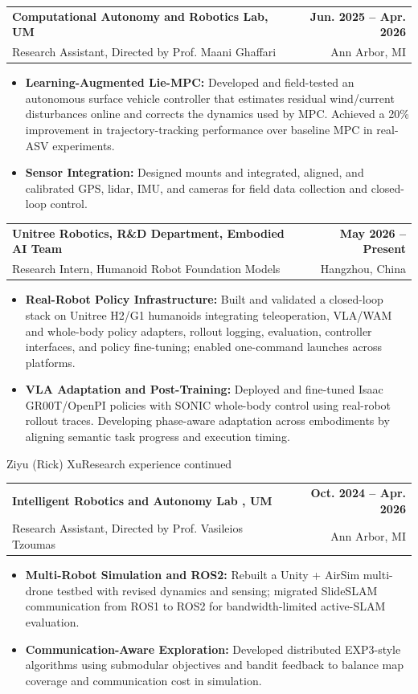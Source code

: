 \documentclass[11pt,letterpaper]{article}
\makeatletter
\newcommand{\resumeSubheading}[4]{
    \begin{tabularx}{\textwidth}{@{}Xr@{}}
        \textbf{#1} & \textbf{#2} \\
        #3 & #4 \\
    \end{tabularx}
}
\newcommand{\resumeItem}[1]{
    \item #1
}
\makeatother
\begin{document}
\resumeSubheading
{Computational Autonomy and Robotics Lab, UM }
{Jun. 2025 -- Apr. 2026}
{\hspace*{1.4em}Research Assistant, Directed by Prof. Maani Ghaffari}
{Ann Arbor, MI}
\begin{itemize}[leftmargin=2.4em, itemsep=0.5pt, topsep=0pt]
\small
\resumeItem{\textbf{Learning-Augmented Lie-MPC:} Developed and field-tested an autonomous surface vehicle controller that estimates residual wind/current disturbances online and corrects the dynamics used by MPC. Achieved a 20\% improvement in trajectory-tracking performance over baseline MPC in real-ASV experiments.}
\resumeItem{\textbf{Sensor Integration:} Designed mounts and integrated, aligned, and calibrated GPS, lidar, IMU, and cameras for field data collection and closed-loop control.}
\end{itemize}

\resumeSubheading
{ Unitree Robotics, R\&D Department, Embodied AI Team}
{May 2026 -- Present}
{\hspace*{1.4em}Research Intern, Humanoid Robot Foundation Models}
{Hangzhou, China}
\begin{itemize}[leftmargin=2.4em, itemsep=0.5pt, topsep=0pt]
\small
\resumeItem{\textbf{Real-Robot Policy Infrastructure:} Built and validated a closed-loop stack on Unitree H2/G1 humanoids integrating teleoperation, VLA/WAM and whole-body policy adapters, rollout logging, evaluation, controller interfaces, and policy fine-tuning; enabled one-command launches across platforms.}
\resumeItem{\textbf{VLA Adaptation and Post-Training:} Deployed and fine-tuned Isaac GR00T/OpenPI policies with SONIC whole-body control using real-robot rollout traces. Developing phase-aware adaptation across embodiments by aligning semantic task progress and execution timing.}
\end{itemize}

\newpage
{\small Ziyu (Rick) Xu}\hfill{\small Research experience continued}
\vspace{4pt}
\resumeSubheading
{Intelligent Robotics and Autonomy Lab , UM}
{Oct. 2024 -- Apr. 2026}
{\hspace*{1.4em}Research Assistant, Directed by Prof. Vasileios Tzoumas}
{Ann Arbor, MI}
\begin{itemize}[leftmargin=2.4em, itemsep=0.5pt, topsep=0pt]
\small
\resumeItem{\textbf{Multi-Robot Simulation and ROS2:} Rebuilt a Unity + AirSim multi-drone testbed with revised dynamics and sensing; migrated SlideSLAM communication from ROS1 to ROS2 for bandwidth-limited active-SLAM evaluation.}
\resumeItem{\textbf{Communication-Aware Exploration:} Developed distributed EXP3-style algorithms using submodular objectives and bandit feedback to balance map coverage and communication cost in simulation.}
\end{itemize}
\end{document}
